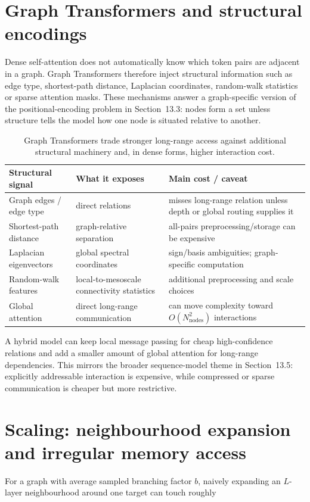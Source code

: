\section{Graph Transformers and structural encodings}
Dense self-attention does not automatically know which token pairs are adjacent in a graph.
Graph Transformers therefore inject structural information such as edge type, shortest-path distance, Laplacian coordinates, random-walk statistics or sparse attention masks.
These mechanisms answer a graph-specific version of the positional-encoding problem in Section~13.3: nodes form a set unless structure tells the model how one node is situated relative to another.

\begin{table}[htbp]
\centering
\small
\begin{tabular}{p{}p{}p{}}
\toprule
Structural signal & What it exposes & Main cost / caveat \\
\midrule
Graph edges / edge type & direct relations & misses long-range relation unless depth or global routing supplies it \\
Shortest-path distance & graph-relative separation & all-pairs preprocessing/storage can be expensive \\
Laplacian eigenvectors & global spectral coordinates & sign/basis ambiguities; graph-specific computation \\
Random-walk features & local-to-mesoscale connectivity statistics & additional preprocessing and scale choices \\
Global attention & direct long-range communication & can move complexity toward $O(N_{\text{nodes}}^2)$ interactions \\
\bottomrule
\end{tabular}
\caption{Graph Transformers trade stronger long-range access against additional structural machinery and, in dense forms, higher interaction cost.}
\label{tab:gnn-graph-transformer-structure}
\end{table}

A hybrid model can keep local message passing for cheap high-confidence relations and add a smaller amount of global attention for long-range dependencies.
This mirrors the broader sequence-model theme in Section~13.5: explicitly addressable interaction is expensive, while compressed or sparse communication is cheaper but more restrictive.

\section{Scaling: neighbourhood expansion and irregular memory access}
For a graph with average sampled branching factor $b$, naively expanding an $L$-layer neighbourhood around one target can touch roughly

